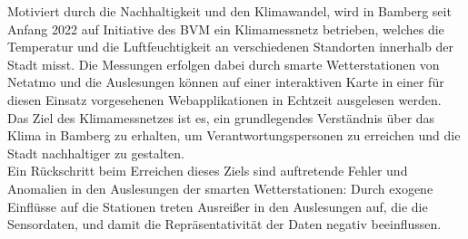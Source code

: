 Motiviert durch die Nachhaltigkeit und den Klimawandel, wird in Bamberg seit Anfang 2022 auf Initiative des \ac{BVM} ein Klimamessnetz betrieben, welches die Temperatur und die Luftfeuchtigkeit an verschiedenen Standorten innerhalb der Stadt misst. Die Messungen erfolgen dabei durch smarte Wetterstationen von Netatmo und die Auslesungen können auf einer interaktiven Karte in einer für diesen Einsatz vorgesehenen Webapplikationen in Echtzeit ausgelesen werden. Das Ziel des Klimamessnetzes ist es, ein grundlegendes Verständnis über das Klima in Bamberg zu erhalten, um Verantwortungspersonen zu erreichen und die Stadt nachhaltiger zu gestalten. \\ Ein Rückschritt beim Erreichen dieses Ziels sind auftretende Fehler und Anomalien in den Auslesungen der smarten Wetterstationen: Durch exogene Einflüsse auf die Stationen treten Ausreißer in den Auslesungen auf, die die Sensordaten, und damit die Repräsentativität der Daten negativ beeinflussen. 

